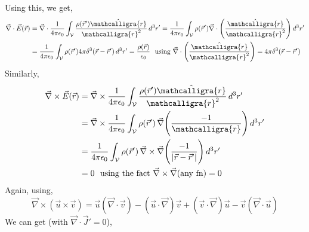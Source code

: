 \documentclass{article}
\newcommand{\scriptr}{\mathord{\mathcalligra{r}}}
\begin{document}
Using this, we get,
\begin{equation}
    \begin{split}
        \vec{\nabla}\cdot \vec{E}(\vec{r}) & = \vec{\nabla}\cdot \frac{1}{4\pi \epsilon_0} 
\int_{\mathcal{V}} \frac{\rho(\vec{r}')\hat{\scriptr}}{\scriptr^2} \, d^3r' = \frac{1}{4\pi \epsilon_0} 
\int_{\mathcal{V}}\rho(\vec{r}') \vec{\nabla}\cdot \Bigg(\frac{\hat{\scriptr}}{\scriptr^2}\Bigg) \, d^3r'\\ 
& = \frac{1}{4\pi \epsilon_0} 
\int_{\mathcal{V}}\rho(\vec{r}') 4\pi \delta^3(\vec{r}-\vec{r}') \, d^3r' = \frac{\rho(\vec{r})}{\epsilon_0} \, \, \text{ using }\vec{\nabla}\cdot \Bigg(\frac{\hat{\scriptr}}{\scriptr^2}\Bigg)=4\pi \delta^3(\vec{r}-\vec{r}')
    \end{split}
\label{gauss_1}
\end{equation}
Similarly,
\begin{equation}
    \begin{split}
        \vec{\nabla}\times \vec{E}(\vec{r}) & = \vec{\nabla}\times \frac{1}{4\pi \epsilon_0} 
\int_{\mathcal{V}} \frac{\rho(\vec{r}')\hat{\scriptr}}{\scriptr^2} \, d^3r'\\ 
& = \vec{\nabla}\times \frac{1}{4\pi \epsilon_0} 
\int_{\mathcal{V}} \rho(\vec{r}')\, \vec{\nabla} \Bigg(\frac{-1}{\scriptr}\Bigg) \, d^3r'\\ 
& =  \frac{1}{4\pi \epsilon_0} 
\int_{\mathcal{V}} \rho(\vec{r}')\, \vec{\nabla}\times\vec{\nabla} \Bigg(\frac{-1}{|\vec{r}-\vec{r}'|}\Bigg) \, d^3r'\\ 
& = 0  \, \, \text{ using the fact }\vec{\nabla}\times\vec{\nabla}(\text{any fn})=0
    \end{split}
\label{curlE_1}
\end{equation}
Again, using,
\begin{equation}
    \vec{\nabla}\times (\vec{u}\times \vec{v})=\vec{u}(\vec{\nabla}\cdot \vec{v}) - (\vec{u}\cdot \vec{\nabla})\vec{v} + (\vec{v}\cdot \vec{\nabla})\vec{u} - \vec{v}(\vec{\nabla}\cdot \vec{u}) 
\end{equation}
We can get (with $\vec{\nabla}\cdot \vec{J}'=0$),
\end{document}
